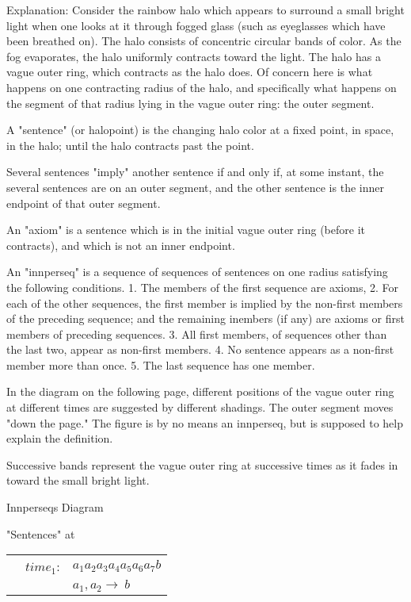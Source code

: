 \begin{sysrules}
Explanation: Consider the rainbow halo which appears to surround a small 
bright light when one looks at it through fogged glass (such as 
eyeglasses which have been breathed on). The halo consists of 
concentric circular bands of color. As the fog evaporates, the halo 
uniformly contracts toward the light. The halo has a vague outer 
ring, which contracts as the halo does. Of concern here is what 
happens on one contracting radius of the halo, and specifically 
what happens on the segment of that radius lying in the vague 
outer ring: the outer segment. 

A "sentence" (or halopoint) is the changing halo color at a fixed point, in 
space, in the halo; until the halo contracts past the point. 

Several sentences "imply" another sentence if and only if, at some instant, 
the several sentences are on an outer segment, and the other 
sentence is the inner endpoint of that outer segment. 

An "axiom" is a sentence which is in the initial vague outer ring (before it 
contracts), and which is not an inner endpoint. 

An "innperseq" is a sequence of sequences of sentences on one radius 
satisfying the following conditions. 1. The members of the first 
sequence are axioms, 2. For each of the other sequences, the first 
member is implied by the non-first members of the preceding 
sequence; and the remaining inembers (if any) are axioms or first 
members of preceding sequences. 3. All first members, of 
sequences other than the last two, appear as non-first members. 4. 
No sentence appears as a non-first member more than once. 5. The 
last sequence has one member. 

In the diagram on the following page, different positions of the vague outer 
ring at different times are suggested by different shadings. The 
outer segment moves "down the page." The figure is by no means 
an innperseq, but is supposed to help explain the definition. 
\end{sysrules}

Successive bands represent the vague outer ring at successive times as it fades in 
toward the small bright light.

Innperseqs Diagram 


"Sentences" at 

	\begin{tabular}{ c r l }
		\bimg{time1} & $time_1$: & $a_1 a_2 a_3 a_4 a_5 a_6 a_7 b$ \\
		& & $a_1,a_2 \rightarrow\ b$ \\
	\end{tabular}

